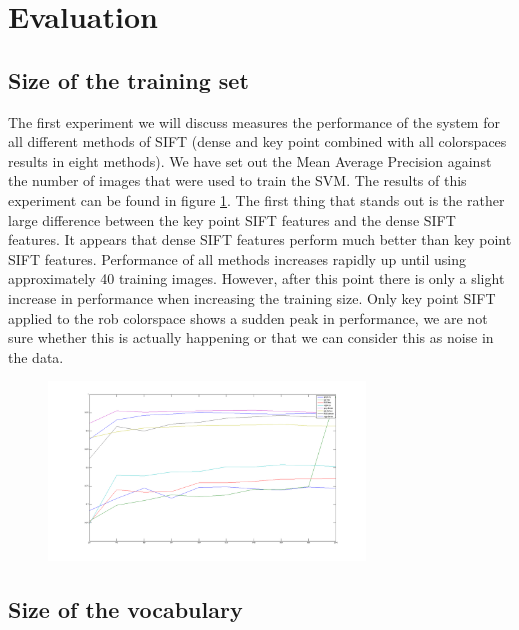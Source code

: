 \documentclass[11pt]{article}
\begin{document}
\section{Evaluation}

\subsection{Size of the training set}
The first experiment we will discuss measures the performance of the system for all different methods of SIFT (dense and key point combined with all colorspaces results in eight methods). We have set out the Mean Average Precision against the number of images that were used to train the SVM. The results of this experiment can be found in figure \ref{trainingSizes}. The first thing that stands out is the rather large difference between the key point SIFT features and the dense SIFT features. It appears that dense SIFT features perform much better than key point SIFT features. Performance of all methods increases rapidly up until using approximately 40 training images. However, after this point there is only a slight increase in performance when increasing the training size. Only key point SIFT applied to the rob colorspace shows a sudden peak in performance, we are not sure whether this is actually happening or that we can consider this as noise in the data. 
\begin{figure}[H]
  \centering
    \includegraphics[width=0.75\textwidth]{trainingSizes}
      \caption{}
      \label{trainingSizes}
\end{figure}

\subsection{Size of the vocabulary}
\end{document}
